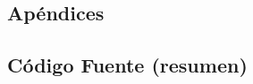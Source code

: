 \documentclass[12pt, a4paper, twoside]{article}
\begin{document}
\begin{TP3}
  \newpage
\section{Apéndices}\label{sec:apendices}
  
  \subsection{Código Fuente (resumen)}\label{subsec:codigo-fuente}
  
  \clearpage
  
  
% 


\end{TP3}
\end{document}
